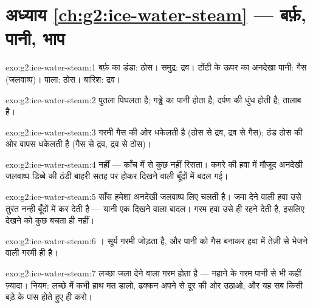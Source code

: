 \section*{अध्याय \ref{ch:g2:ice-water-steam} --- बर्फ़, पानी, भाप}

\begin{solution}{exo:g2:ice-water-steam:1}
बर्फ़ का डंडा: ठोस। समुद्र: द्रव। टोंटी के ऊपर का अनदेखा पानी: गैस
(जलवाष्प)। पाला: ठोस। बारिश: द्रव।
\end{solution}

\begin{solution}{exo:g2:ice-water-steam:2}
पुतला पिघलता है; गड्ढे का पानी  होता है; दर्पण की धुंध
 होती है; तालाब  है।
\end{solution}

\begin{solution}{exo:g2:ice-water-steam:3}
गरमी गैस की ओर धकेलती है (ठोस से द्रव, द्रव से गैस); ठंड ठोस की ओर
वापस धकेलती है (गैस से द्रव, द्रव से ठोस)।
\end{solution}

\begin{solution}{exo:g2:ice-water-steam:4}
नहीं --- काँच में से कुछ नहीं रिसता। कमरे की हवा में मौजूद अनदेखी
जलवाष्प डिब्बे की ठंडी बाहरी सतह पर  होकर दिखने वाली बूँदों में
बदल गई।
\end{solution}

\begin{solution}{exo:g2:ice-water-steam:5}
साँस हमेशा अनदेखी जलवाष्प लिए चलती है। जमा देने वाली हवा उसे तुरंत
नन्ही बूँदों में  कर देती है --- यानी एक दिखने वाला बादल। गरम
हवा उसे  ही रहने देती है, इसलिए देखने को कुछ बचता ही नहीं।
\end{solution}

\begin{solution}{exo:g2:ice-water-steam:6}
। सूर्य गरमी जोड़ता है, और पानी को गैस बनाकर हवा में तेज़ी से
भेजने वाली गरमी ही है।
\end{solution}

\begin{solution}{exo:g2:ice-water-steam:7}
लच्छा जला देने वाला गरम होता है --- नहाने के गरम पानी से भी कहीं
ज़्यादा। नियम: लच्छे में कभी हाथ मत डालो, ढक्कन अपने से दूर की ओर
उठाओ, और यह सब किसी बड़े के पास होते हुए ही करो।
\end{solution}

